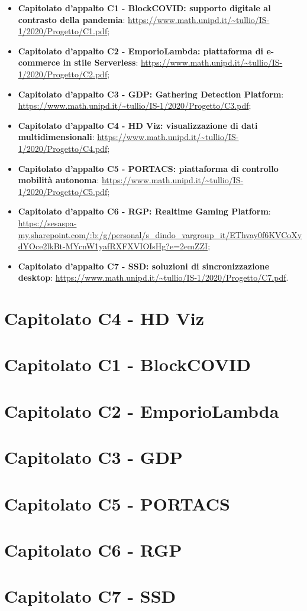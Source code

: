 \documentclass{article}
\begin{document}
\begin{itemize}
  \item \textbf{Capitolato d'appalto C1 - BlockCOVID: supporto digitale al contrasto della pandemia}: \url{https://www.math.unipd.it/~tullio/IS-1/2020/Progetto/C1.pdf};
  \item \textbf{Capitolato d'appalto C2 - EmporioLambda: piattaforma di e-commerce in stile Serverless}: \url{https://www.math.unipd.it/~tullio/IS-1/2020/Progetto/C2.pdf};
  \item \textbf{Capitolato d'appalto C3 - GDP: Gathering Detection Platform}: \url{https://www.math.unipd.it/~tullio/IS-1/2020/Progetto/C3.pdf};
  \item \textbf{Capitolato d'appalto C4 - HD Viz: visualizzazione di dati multidimensionali}: \url{https://www.math.unipd.it/~tullio/IS-1/2020/Progetto/C4.pdf};
  \item \textbf{Capitolato d'appalto C5 - PORTACS: piattaforma di controllo mobilità autonoma}: \url{https://www.math.unipd.it/~tullio/IS-1/2020/Progetto/C5.pdf};
  \item \textbf{Capitolato d'appalto C6 - RGP: Realtime Gaming Platform}: \url{https://sesaspa-my.sharepoint.com/:b:/g/personal/s_dindo_vargroup_it/EThvay0f6KVCoXydYOce2lkBt-MYcnW1yafRXFXVIOIsHg?e=2emZZI};
  \item \textbf{Capitolato d'appalto C7 - SSD: soluzioni di sincronizzazione desktop}: \url{https://www.math.unipd.it/~tullio/IS-1/2020/Progetto/C7.pdf}.
\end{itemize}


\section{Capitolato C4 - HD Viz}
\label{sec:c4}


\newpage
\section{Capitolato C1 - BlockCOVID}
\label{sec:c1}


\newpage
\section{Capitolato C2 - EmporioLambda}
\label{sec:c2}


\newpage
\section{Capitolato C3 - GDP}
\label{sec:c3}


\newpage
\section{Capitolato C5 - PORTACS}
\label{sec:c5}


\newpage
\section{Capitolato C6 - RGP}
\label{sec:c6}


\newpage
\section{Capitolato C7 - SSD}
\label{sec:c7}

\end{document}
